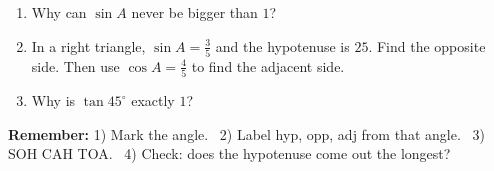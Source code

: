\documentclass[12pt,letterpaper]{article}
\newif\ifkey
\newcommand{\work}[2][]{\ifkey\begin{sol}#2\end{sol}\else\vspace*{#1}\fi}
\newcommand{\np}[1][6cm]{\needspace{#1}}
\begin{document}
\begin{enumerate}[resume,leftmargin=*,label=\textbf{\arabic*.},itemsep=6pt]
\np\item Why can $\sin A$ never be bigger than $1$?
\work[2cm]{$\sin A=\frac{\text{opposite}}{\text{hypotenuse}}$ and the hypotenuse is the longest side, so the top is smaller than the bottom: the fraction is less than $1$.}
\np\item In a right triangle, $\sin A=\frac35$ and the hypotenuse is $25$. Find the opposite side. Then use $\cos A=\frac45$ to find the adjacent side.
\work[2.2cm]{Opposite $=\frac35\times25=15$. \ Adjacent $=\frac45\times25=20$. \ ($15$-$20$-$25$ is the $3$-$4$-$5$ triangle scaled by $5$.)}
\np\item Why is $\tan45^\circ$ exactly $1$?
\work[2cm]{The angles are $90^\circ$, $45^\circ$, $45^\circ$, so two angles are equal and the two legs are equal. $\tan45^\circ=\frac{\text{opp}}{\text{adj}}=\frac{\text{same}}{\text{same}}=1$.}
\end{enumerate}

\ifkey\else
\vfill
\begin{simple}
\textbf{Remember:} 1) Mark the angle. \ 2) Label hyp, opp, adj from that angle. \ 3) SOH CAH TOA. \ 4) Check: does the hypotenuse come out the longest?
\end{simple}
\fi
\end{document}
